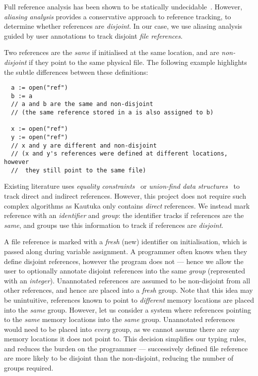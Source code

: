 \label{sec:3.4.1}

Full reference analysis has been shown to be statically undecidable~\cite{reps2000undecidability}.  However, \textit{aliasing analysis} provides a conservative approach to reference tracking, to determine whether references are \textit{disjoint}. In our case, we use aliasing analysis guided by user annotations to track disjoint \textit{file references}.

Two references are the \textit{same} if initialised at the same location, and are \textit{non-disjoint} if they point to the same physical file. The following example highlights the subtle differences between these definitions:

\begin{verbatim}
  a := open("ref")
  b := a 
  // a and b are the same and non-disjoint 
  // (the same reference stored in a is also assigned to b)

  x := open("ref")
  y := open("ref")
  // x and y are different and non-disjoint
  // (x and y's references were defined at different locations, however 
  //  they still point to the same file)
\end{verbatim}

Existing literature uses \textit{equality constraints}~\cite{10.1145/237721.237727} or \textit{union-find data structures}~\cite{andersen1994program} to track direct and indirect references. However, this project does not require such complex algorithms as Kautuka only contains \textit{direct} references. We instead mark reference with an \textit{identifier} and \textit{group}: the identifier tracks if references are the \textit{same}, and groups use this information to track if references are \textit{disjoint}.

A file reference is marked with a \textit{fresh} (new) identifier on initialisation, which is passed along during variable assignment. A programmer often knows when they define disjoint references, however the program does not --- hence we allow the user to optionally annotate disjoint references into the same \textit{group} (represented with an \textit{integer}). Unannotated references are assumed to be non-disjoint from all other references, and hence are placed into a \textit{fresh} group. Note that this idea may be unintuitive, references known to point to \textit{different} memory locations are placed into the \textit{same} group. However, let us consider a system where references pointing to the \textit{same} memory locations into the \textit{same} group. Unannotated references would need to be placed into \textit{every} group, as we cannot assume there are any memory locations it does not point to. This decision simplifies our typing rules, and reduces the burden on the programmer --- successively defined file reference are more likely to be disjoint than the non-disjoint, reducing the number of groups required.

